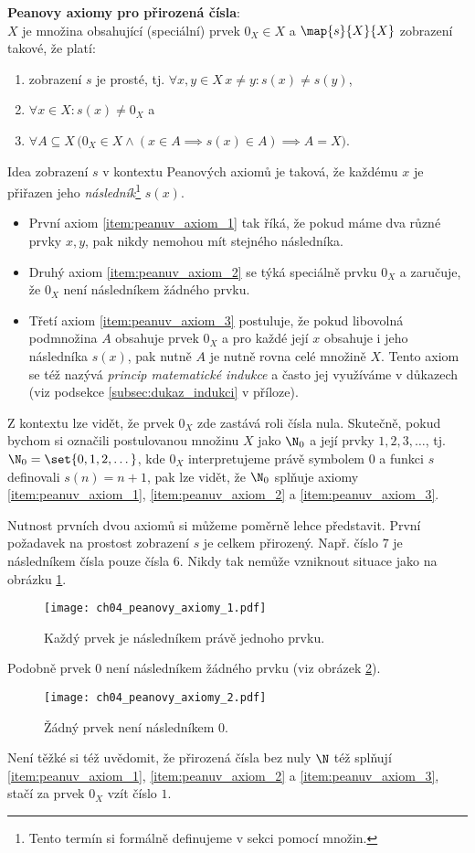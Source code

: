 \noindent\textbf{Peanovy axiomy pro přirozená čísla}:\\
$X$ je množina obsahující (speciální) prvek $0_X\in X$ a $\map{s}{X}{X}$ zobrazení takové, že platí:
\begin{enumerate}[label=({P}\arabic*)]
    \item\label{item:peanuv_axiom_1} zobrazení $s$ je prosté, tj. $\forall x,y\in X\,x\neq y: s(x)\neq s(y)$,
    \item\label{item:peanuv_axiom_2} $\forall x\in X: s(x)\neq 0_X$ a
    \item\label{item:peanuv_axiom_3} $\forall A\subseteq X\,\big(0_X\in X \land (x\in A\implies s(x)\in A)\implies A=X\big)$.
\end{enumerate}
Idea zobrazení $s$ v kontextu Peanových axiomů je taková, že každému $x$ je přiřazen jeho \emph{následník}\footnote{Tento termín si formálně definujeme v sekci  pomocí množin.} $s(x)$.
\begin{itemize}
    \item První axiom \ref{item:peanuv_axiom_1} tak říká, že pokud máme dva různé prvky $x,y$, pak nikdy nemohou mít stejného následníka.
    \item Druhý axiom \ref{item:peanuv_axiom_2} se týká speciálně prvku $0_X$ a zaručuje, že $0_X$ není následníkem žádného prvku.
    \item Třetí axiom \ref{item:peanuv_axiom_3} postuluje, že pokud libovolná podmnožina $A$ obsahuje prvek $0_X$ a pro každé její $x$ obsahuje i jeho následníka $s(x)$, pak nutně $A$ je nutně rovna celé množině $X$. Tento axiom se též nazývá \emph{princip matematické indukce} a často jej využíváme v důkazech (viz podsekce \ref{subsec:dukaz_indukci} v příloze).
\end{itemize}
Z kontextu lze vidět, že prvek $0_X$ zde zastává roli čísla nula. Skutečně, pokud bychom si označili postulovanou množinu $X$ jako $\N_0$ a její prvky $1,2,3,\dots$, tj. $\N_0=\set{0,1,2,\dots}$, kde $0_X$ interpretujeme právě symbolem $0$ a funkci $s$ definovali $s(n)=n+1$, pak lze vidět, že $\N_0$ splňuje axiomy \ref{item:peanuv_axiom_1}, \ref{item:peanuv_axiom_2} a \ref{item:peanuv_axiom_3}.\par
Nutnost prvních dvou axiomů si můžeme poměrně lehce představit. První požadavek na prostost zobrazení $s$ je celkem přirozený. Např. číslo $7$ je následníkem čísla pouze čísla $6$. Nikdy tak nemůže vzniknout situace jako na obrázku \ref{fig:peanovy_axiomy_1}.
\begin{figure}[h]
	\centering
	\texttt{[image: ch04\_peanovy\_axiomy\_1.pdf]}
    \caption{Každý prvek je následníkem právě jednoho prvku.}
    \label{fig:peanovy_axiomy_1}
\end{figure}
Podobně prvek $0$ není následníkem žádného prvku (viz obrázek \ref{fig:peanovy_axiomy_2}).
\begin{figure}[h]
	\centering
	\texttt{[image: ch04\_peanovy\_axiomy\_2.pdf]}
    \caption{Žádný prvek není následníkem 0.}
    \label{fig:peanovy_axiomy_2}
\end{figure}
Není těžké si též uvědomit, že přirozená čísla bez nuly $\N$ též splňují \ref{item:peanuv_axiom_1}, \ref{item:peanuv_axiom_2} a \ref{item:peanuv_axiom_3}, stačí za prvek $0_X$ vzít číslo $1$.